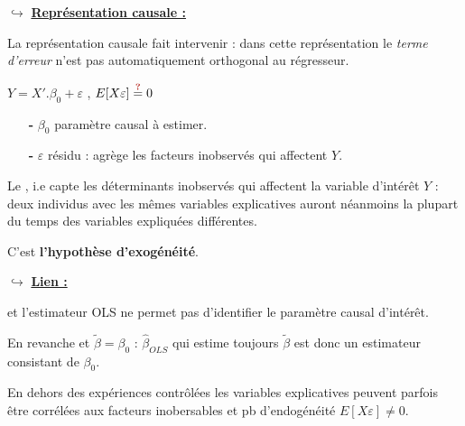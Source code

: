 \bigbreak
\noindent $\hookrightarrow$ \underline{\textbf{Représentation causale :}}\par
La représentation causale fait intervenir  : dans cette représentation le \textit{terme d'erreur} n'est pas automatiquement orthogonal au régresseur.\par
\begin{boxH}
    $Y = X'.\beta_{0} + \varepsilon$ , $E[X\varepsilon]\overset{\textbf{\red{?}}}{=}0$\par
    \begin{itemize}
        \item[\textbf{-}] $\beta_{0}$ paramètre causal à estimer.\par
        \item[\textbf{-}] $\varepsilon$ résidu : agrège les facteurs inobservés qui affectent $Y$.
    \end{itemize}
\end{boxH}
Le , i.e capte les déterminants inobservés qui affectent la variable d'intérêt $Y$ : deux individus avec les mêmes variables explicatives auront néanmoins la plupart du temps des variables expliquées différentes.\par
{} C'est \textbf{l'hypothèse d'exogénéité}.

\bigbreak
\noindent $\hookrightarrow$ \underline{\textbf{Lien :}}\par
{} et l'estimateur OLS ne permet pas d'identifier le paramètre causal d'intérêt.\par
En revanche  et $\widetilde{\beta} = \beta_{0}$ : $\widehat{\beta}_{OLS}$ qui estime toujours $\widetilde{\beta}$ est donc un estimateur consistant de $\beta_{0}$.\par
En dehors des expériences contrôlées les variables explicatives peuvent parfois être corrélées aux facteurs inobersables et pb d'endogénéité $E[X\varepsilon]\neq 0$.
\bigbreak

